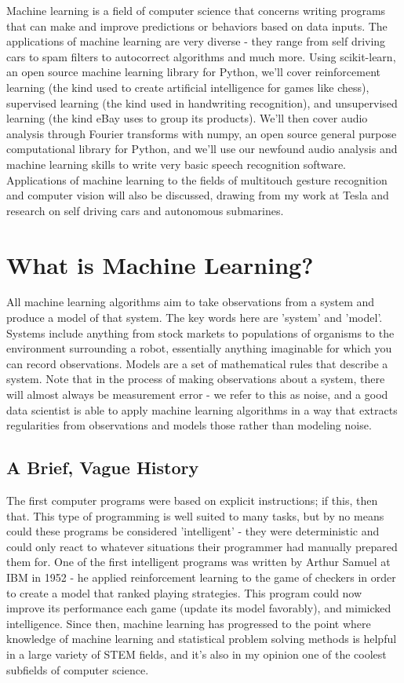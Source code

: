 \documentclass[11pt]{article}
\begin{document}
Machine learning is a field of computer science that concerns writing programs that can make and improve predictions or behaviors based on data inputs. The applications of machine learning are very diverse - they range from self driving cars to spam filters to autocorrect algorithms and much more. Using scikit-learn, an open source machine learning library for Python, we'll cover reinforcement learning (the kind used to create artificial intelligence for games like chess), supervised learning (the kind used in handwriting recognition), and unsupervised learning (the kind eBay uses to group its products). We'll then cover audio analysis through Fourier transforms with numpy, an open source general purpose computational library for Python, and we'll use our newfound audio analysis and machine learning skills to write very basic speech recognition software. Applications of machine learning to the fields of multitouch gesture recognition and computer vision will also be discussed, drawing from my work at Tesla and research on self driving cars and autonomous submarines.


\section{What is Machine Learning?}
All machine learning algorithms aim to take observations from a system and produce a model of that system. The key words here are 'system' and 'model'. Systems include anything from stock markets to populations of organisms to the environment surrounding a robot, essentially anything imaginable for which you can record observations. Models are a set of mathematical rules that describe a system. Note that in the process of making observations about a system, there will almost always be measurement error - we refer to this as noise, and a good data scientist is able to apply machine learning algorithms in a way that extracts regularities from observations and models those rather than modeling noise.
\subsection{A Brief, Vague History}
The first computer programs were based on explicit instructions; if this, then that. This type of programming is well suited to many tasks, but by no means could these programs be considered 'intelligent' - they were deterministic and could only react to whatever situations their programmer had manually prepared them for. One of the first intelligent programs was written by Arthur Samuel at IBM in 1952 - he applied reinforcement learning to the game of checkers in order to create a model that ranked playing strategies. This program could now improve its performance each game (update its model favorably), and mimicked intelligence. 
Since then, machine learning has progressed to the point where knowledge of machine learning and statistical problem solving methods is helpful in a large variety of STEM fields, and it's also in my opinion one of the coolest subfields of computer science.
\end{document}
